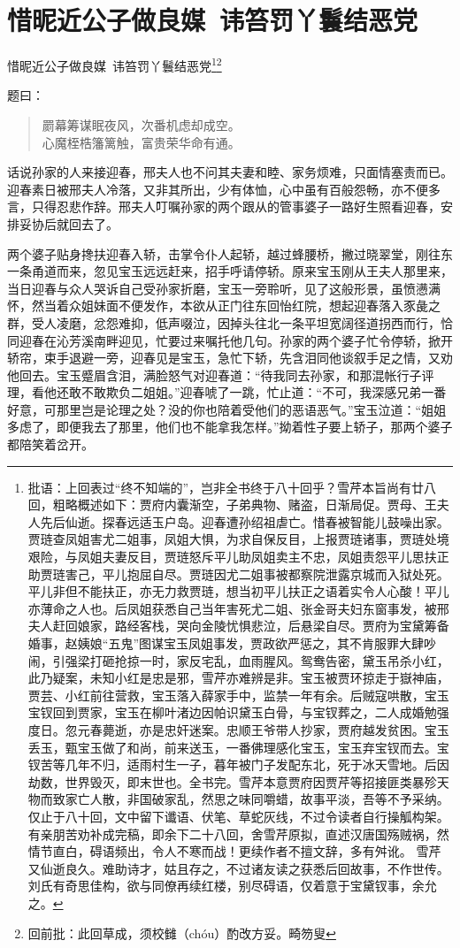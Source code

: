 \documentclass[12pt,oneside]{book}
\newenvironment{shici}{%
\begin{verse}%
\centering\large\hspace{12pt}}%
{\end{verse}}
\begin{document}
\chapter{惜昵近公子做良媒~讳笞罚丫鬟结恶党}
惜昵近公子做良媒~讳笞罚丫鬟结恶党\footnote{批语：上回表过“终不知端的”，岂非全书终于八十回乎？雪芹本旨尚有廿八回，粗略概述如下：贾府内囊渐空，子弟典物、赌盗，日渐局促。贾母、王夫人先后仙逝。探春远适玉户岛。迎春遭孙绍祖虐亡。惜春被智能儿鼓噪出家。贾琏查凤姐害尤二姐事，凤姐大惧，为求自保反目，上报贾琏诸事，贾琏处境艰险，与凤姐夫妻反目，贾琏怒斥平儿助凤姐卖主不忠，凤姐责怨平儿思扶正助贾琏害己，平儿抱屈自尽。贾琏因尤二姐事被都察院泄露京城而入狱处死。平儿非但不能扶正，亦无力救贾琏，想当初平儿扶正之语着实令人心酸！平儿亦薄命之人也。后凤姐获悉自己当年害死尤二姐、张金哥夫妇东窗事发，被邢夫人赶回娘家，路经客栈，哭向金陵忧惧悲泣，后悬梁自尽。贾府为宝黛筹备婚事，赵姨娘“五鬼”图谋宝玉凤姐事发，贾政欲严惩之，其不肯服罪大肆吵闹，引强梁打砸抢掠一时，家反宅乱，血雨腥风。鸳鸯告密，黛玉吊杀小红，此乃疑案，未知小红是忠是邪，雪芹亦难辨是非。宝玉被贾环掠走于嶽神庙，贾芸、小红前往营救，宝玉落入薛家手中，监禁一年有余。后贼寇哄散，宝玉宝钗回到贾家，宝玉在柳叶渚边因帕识黛玉白骨，与宝钗葬之，二人成婚勉强度日。忽元春薨逝，亦是忠奸迷案。忠顺王爷带人抄家，贾府越发贫困。宝玉丢玉，甄宝玉做了和尚，前来送玉，一番佛理感化宝玉，宝玉弃宝钗而去。宝钗苦等几年不归，适雨村生一子，暮年被门子发配东北，死于冰天雪地。后因劫数，世界毁灭，即末世也。全书完。雪芹本意贾府因贾芹等招接匪类暴殄天物而致家亡人散，非国破家乱，然思之味同嚼蜡，故事平淡，吾等不予采纳。仅止于八十回，文中留下谶语、伏笔、草蛇灰线，不过令读者自行操觚构架。有亲朋苦劝补成完稿，即余下二十八回，舍雪芹原拟，直述汉唐国殇贼祸，然情节直白，碍语频出，令人不寒而战！更续作者不擅文辞，多有舛讹。 雪芹又仙逝良久。难助诗才，姑且存之，不过诸友读之获悉后回故事，不作世传。刘氏有奇思佳构，欲与同僚再续红楼，别尽碍语，仅着意于宝黛钗事，余允之。}\footnote{回前批：此回草成，须校雠（chóu）酌改方妥。畸笏叟}

题曰：

\begin{shici}
罽幕筹谋眠夜风，次番机虑却成空。\\
心魔桎梏籓篱触，富贵荣华命有通。
\end{shici}

话说孙家的人来接迎春，邢夫人也不问其夫妻和睦、家务烦难，只面情塞责而已。迎春素日被邢夫人冷落，又非其所出，少有体恤，心中虽有百般怨畅，亦不便多言，只得忍悲作辞。邢夫人叮嘱孙家的两个跟从的管事婆子一路好生照看迎春，安排妥协后就回去了。

两个婆子贴身搀扶迎春入轿，击掌令仆人起轿，越过蜂腰桥，撇过晓翠堂，刚往东一条甬道而来，忽见宝玉远远赶来，招手呼请停轿。原来宝玉刚从王夫人那里来，当日迎春与众人哭诉自己受孙家折磨，宝玉一旁聆听，见了这般形景，虽愤懑满怀，然当着众姐妹面不便发作，本欲从正门往东回怡红院，想起迎春落入豕彘之群，受人凌磨，忿怨难抑，低声啜泣，因掉头往北一条平坦宽阔径道拐西而行，恰同迎春在沁芳溪南畔迎见，忙要过来嘱托他几句。孙家的两个婆子忙令停轿，掀开轿帘，束手退避一旁，迎春见是宝玉，急忙下轿，先含泪同他谈叙手足之情，又劝他回去。宝玉蹙眉含泪，满脸怒气对迎春道：“待我同去孙家，和那混帐行子评理，看他还敢不敢欺负二姐姐。”迎春唬了一跳，忙止道：“不可，我深感兄弟一番好意，可那里岂是论理之处？没的你也陪着受他们的恶语恶气。”宝玉泣道：“姐姐多虑了，即便我去了那里，他们也不能拿我怎样。”拗着性子要上轿子，那两个婆子都陪笑着岔开。
\end{document}
